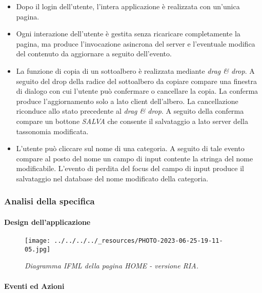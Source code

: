 \begin{itemize}
\tightlist
\item
  Dopo il login dell'utente, l'intera applicazione è realizzata con
  un'unica pagina.
\item
  Ogni interazione dell'utente è gestita senza ricaricare completamente
  la pagina, ma produce l'invocazione asincrona del server e l'eventuale
  modifica del contenuto da aggiornare a seguito dell'evento.
\item
  La funzione di copia di un sottoalbero è realizzata mediante
  \emph{drag \& drop}. A seguito del drop della radice del sottoalbero
  da copiare compare una finestra di dialogo con cui l'utente può
  confermare o cancellare la copia. La conferma produce l'aggiornamento
  solo a lato client dell'albero. La cancellazione riconduce allo stato
  precedente al \emph{drag \& drop}. A seguito della conferma compare un
  bottone \emph{SALVA} che consente il salvataggio a lato server della
  tassonomia modificata.
\item
  L'utente può cliccare sul nome di una categoria. A seguito di tale
  evento compare al posto del nome un campo di input contente la stringa
  del nome modificabile. L'evento di perdita del focus del campo di
  input produce il salvataggio nel database del nome modificato della
  categoria.
\end{itemize}

\hypertarget{analisi-della-specifica-1}{%
\subsubsection{Analisi della
specifica}\label{analisi-della-specifica-1}}

\hypertarget{design-dellapplicazione-1}{%
\paragraph{Design dell'applicazione}\label{design-dellapplicazione-1}}

\begin{figure}
\centering
\texttt{[image: ../../../../\_resources/PHOTO-2023-06-25-19-11-05.jpg]}
\caption{\emph{Diagramma IFML della pagina HOME - versione RIA.}}
\end{figure}

\hypertarget{eventi-ed-azioni}{%
\paragraph{Eventi ed Azioni}\label{eventi-ed-azioni}}

